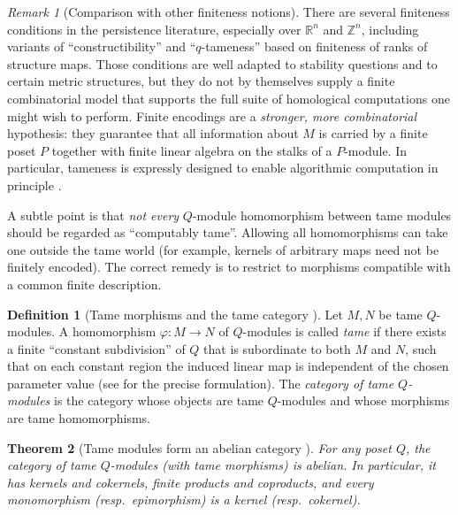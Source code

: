 \documentclass{article}
\newcommand{\<}{\langle}
\renewcommand{\>}{\rangle}
\newcommand{\bbb}[1]{\ensuremath{\mathbb{#1}}}
\newtheorem{theorem}{Theorem}
\theoremstyle{definition}
\newtheorem{defn}[theorem]{Definition}
\theoremstyle{remark}
\newtheorem*{remark}{Remark}
\begin{document}
	\begin{remark}[Comparison with other finiteness notions]
		\label{rem:other-tameness}
		There are several finiteness conditions in the persistence literature, especially over
		$\bbb{R}^n$ and $\bbb{Z}^n$, including variants of ``constructibility'' and ``$q$-tameness''
		based on finiteness of ranks of structure maps.
		Those conditions are well adapted to stability questions and to certain metric structures,
		but they do not by themselves supply a finite combinatorial model that supports the full
		suite of homological computations one might wish to perform.
		Finite encodings are a \emph{stronger, more combinatorial} hypothesis: they guarantee
		that all information about $M$ is carried by a finite poset $P$ together with finite
		linear algebra on the stalks of a $P$-module.  In particular, tameness is expressly
		designed to enable algorithmic computation in principle \cite{Mil20}.
	\end{remark}
	
	A subtle point is that \emph{not every} $Q$-module homomorphism between tame modules
	should be regarded as ``computably tame''.  Allowing all homomorphisms can take one
	outside the tame world (for example, kernels of arbitrary maps need not be finitely
	encoded).  The correct remedy is to restrict to morphisms compatible with a common
	finite description.
	
	\begin{defn}[Tame morphisms and the tame category {\cite[Def.~4.27, Def.~4.29]{Mil20}}]
		\label{def:tame-morphism}
		Let $M,N$ be tame $Q$-modules.
		A homomorphism $\varphi\colon M\to N$ of $Q$-modules is called \emph{tame} if there
		exists a finite ``constant subdivision'' of $Q$ that is subordinate to both $M$ and $N$,
		such that on each constant region the induced linear map is independent of the chosen
		parameter value (see \cite[Def.~4.27]{Mil20} for the precise formulation).
		The \emph{category of tame $Q$-modules} is the category whose objects are tame
		$Q$-modules and whose morphisms are tame homomorphisms.
	\end{defn}
	
	\begin{theorem}[Tame modules form an abelian category {\cite[Prop.~4.31]{Mil20}}]
		\label{thm:tame-abelian}
		For any poset $Q$, the category of tame $Q$-modules (with tame morphisms) is abelian.
		In particular, it has kernels and cokernels, finite products and coproducts, and every
		monomorphism (resp.\ epimorphism) is a kernel (resp.\ cokernel).
	\end{theorem}
	
\end{document}
